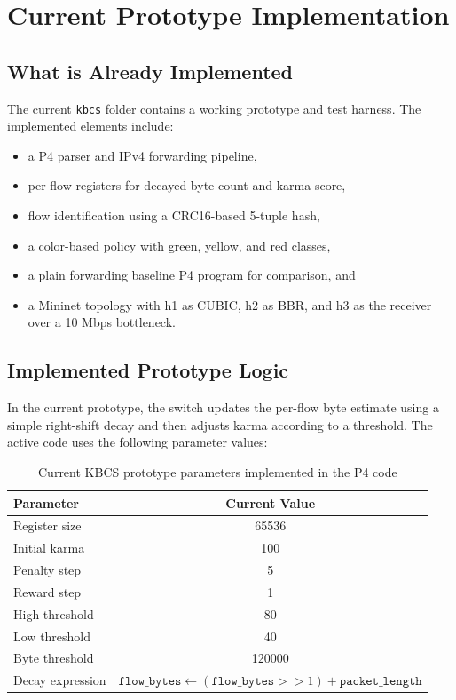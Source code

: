\documentclass[12pt,a4paper]{report}
\begin{document}
\chapter{Current Prototype Implementation}

\section{What is Already Implemented}
The current \texttt{kbcs} folder contains a working prototype and test harness. The implemented elements include:
\begin{itemize}
    \item a P4 parser and IPv4 forwarding pipeline,
    \item per-flow registers for decayed byte count and karma score,
    \item flow identification using a CRC16-based 5-tuple hash,
    \item a color-based policy with green, yellow, and red classes,
    \item a plain forwarding baseline P4 program for comparison, and
    \item a Mininet topology with h1 as CUBIC, h2 as BBR, and h3 as the receiver over a 10 Mbps bottleneck.
\end{itemize}

\section{Implemented Prototype Logic}
In the current prototype, the switch updates the per-flow byte estimate using a simple right-shift decay and then adjusts karma according to a threshold. The active code uses the following parameter values:

\begin{table}[H]
\centering
\caption{Current KBCS prototype parameters implemented in the P4 code}
\label{tab:prototype_params}
\renewcommand{\arraystretch}{1.3}
\begin{tabular}{@{}lc@{}}
\toprule
\textbf{Parameter} & \textbf{Current Value} \\
\midrule
Register size & 65536 \\
Initial karma & 100 \\
Penalty step & 5 \\
Reward step & 1 \\
High threshold & 80 \\
Low threshold & 40 \\
Byte threshold & 120000 \\
Decay expression & $\texttt{flow\_bytes} \leftarrow (\texttt{flow\_bytes} >> 1) + \texttt{packet\_length}$ \\
\bottomrule
\end{tabular}
\end{table}
\end{document}
